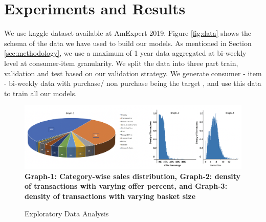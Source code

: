 \section{Experiments and Results}
\label{sec:eval}
We use kaggle dataset available at AmExpert 2019. Figure \ref{fig:data} shows the schema of the data we have used 
to build our models. As mentioned in Section \ref{sec:methodology}, we use a maximum of 1 year data aggregated at bi-weekly 
level at consumer-item granularity. We split the data into three part train, validation and test based 
on our validation strategy. We generate consumer - item - bi-weekly data with purchase/ non purchase 
being the target , and use this data to train all our models.
  \begin{figure}[hbt!]
    \centering 
    \caption{Exploratory Data Analysis} 
    \includegraphics[width=5.5in]{img/sales_dist.png} 
    \\ {\scriptsize \bf Graph-1: Category-wise sales distribution, Graph-2:  density of transactions with varying offer percent,
    and Graph-3: density of transactions with varying basket size}
    \label{fig:sales_dist} 
  \end{figure}
